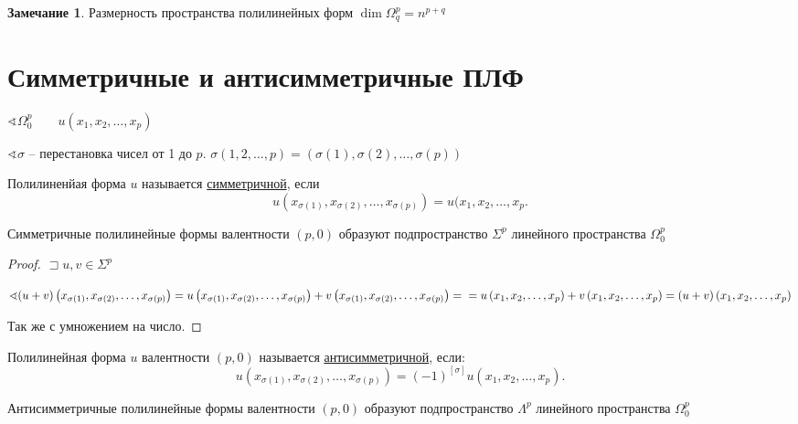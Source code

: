 \documentclass{book}
\theoremstyle{definition}
\newtheorem*{note}{Замечание}
\begin{document}
    \begin{note}
        Размерность пространства полилинейных форм $\dim \Omega_q^p = n^{p+q}$
    \end{note}

    \section{Симметричные и антисимметричные ПЛФ}

    $\sphericalangle \Omega_0^p\qquad u\left( x_1, x_2, \ldots, x_p \right) $ 

    $\sphericalangle \sigma$ -- перестановка чисел от 1 до $p$.  $\sigma\left( 1, 2, \ldots, p \right)  = \left( \sigma(1), \sigma(2), \ldots, \sigma(p) \right) $

    \begin{definition}
    Полилиненйая форма $u$ называется \underline{симметричной}, если \[
            u\left( x_{\sigma(1)}, x_{\sigma(2)}, \ldots, x_{\sigma(p)} \right) = u(x_1, x_2, \ldots, x_p 
        .\]  
    \end{definition}

    \begin{lemma}
        Симметричные полилинейные формы валентности $(p,0)$ образуют подпространство $\Sigma^p$ линейного пространства $\Omega_0^p$
    \end{lemma}
    \begin{proof}
        $ \sqsupset u, v\in \Sigma^p$

        $\sphericalangle (u+v)\left( x_{\sigma(1)}, x_{\sigma(2)}, \ldots, x_{\sigma(p)} \right) = u\left( x_{\sigma(1)}, x_{\sigma(2)}, \ldots, x_{\sigma(p)} \right)  + v\left( x_{\sigma(1)}, x_{\sigma(2)}, \ldots, x_{\sigma(p)} \right) =\\=u\left( x_1, x_2, \ldots, x_p \right) + v\left( x_1, x_2, \ldots, x_p \right)  = (u+v)\left( x_1, x_2, \ldots, x_p \right)  $

        Так же с умножением на число.
    \end{proof}

    \begin{definition}
        Полилинейная форма $u$ валентности $(p,0)$ называется \underline{антисимметричной}, если:
        \[
            u\left( x_{\sigma(1)}, x_{\sigma(2)}, \ldots, x_{\sigma(p)} \right) = (-1)^{[\sigma]}u(x_1, x_2, \ldots, x_p) 
        .\]
    \end{definition}
    \begin{lemma}
        Антисимметричные полилинейные формы валентности $(p,0)$ образуют подпространство $\Lambda^p$ линейного пространства  $\Omega_0^p$
    \end{lemma}
\end{document}
